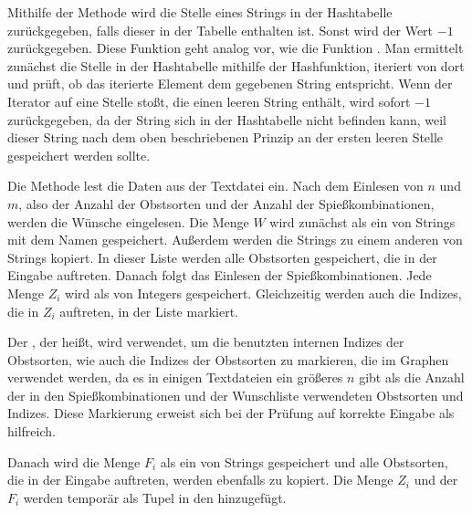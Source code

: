 Mithilfe der Methode  wird die Stelle eines Strings in der Hashtabelle zurückgegeben, 
falls dieser in der Tabelle enthalten ist. Sonst wird der Wert $-1$ zurückgegeben.
Diese Funktion geht analog vor, wie die Funktion .
Man ermittelt zunächst die Stelle in der Hashtabelle mithilfe der Hashfunktion,
iteriert von dort und prüft, ob das iterierte Element dem gegebenen String entspricht.
Wenn der Iterator auf eine Stelle stoßt, die einen leeren String enthält,
wird sofort $-1$ zurückgegeben, da der String sich in der Hashtabelle nicht befinden kann,
weil dieser String nach dem oben beschriebenen Prinzip an der ersten leeren Stelle 
gespeichert werden sollte.

Die Methode  lest die Daten aus der Textdatei ein. 
Nach dem Einlesen von $n$ und $m$, also der Anzahl der Obstsorten und der Anzahl der Spießkombinationen,
werden die Wünsche eingelesen.
Die Menge $W$ wird zunächst als ein  von Strings mit dem Namen  gespeichert.
Außerdem werden die Strings zu einem anderen  von Strings  kopiert.
In dieser Liste werden alle Obstsorten gespeichert, die in der Eingabe auftreten. 
Danach folgt das Einlesen der Spießkombinationen.
Jede Menge $Z_i$ wird als  von Integers gespeichert.
Gleichzeitig werden auch die Indizes, die in $Z_i$ auftreten, in der Liste  markiert.

Der , der  heißt, wird verwendet, um die benutzten internen Indizes der Obstsorten,
wie auch die Indizes der Obstsorten zu markieren, die im Graphen verwendet werden,
da es in einigen Textdateien ein größeres $n$ gibt als die Anzahl der in den Spießkombinationen 
und der Wunschliste verwendeten Obstsorten und Indizes. 
Diese Markierung erweist sich bei der Prüfung auf korrekte Eingabe als hilfreich.

Danach wird die Menge $F_i$ als ein  von Strings gespeichert und 
alle Obstsorten, die in der Eingabe auftreten, werden ebenfalls zu  kopiert.
Die Menge $Z_i$ und der  $F_i$ werden temporär als Tupel in den 
 hinzugefügt.

